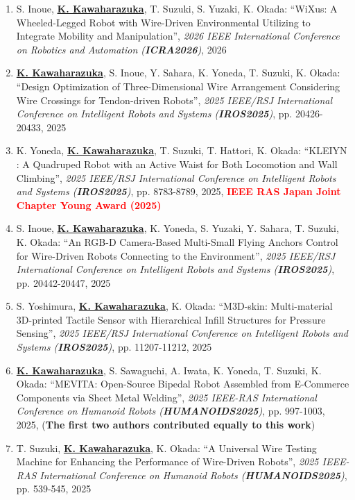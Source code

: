 \documentclass[letterpaper,11pt]{article}
\begin{document}
\begin{enumerate}
\item S. Inoue, \underline{\textbf{K. Kawaharazuka}}, T. Suzuki, S. Yuzaki, K. Okada: ``WiXus: A Wheeled-Legged Robot with Wire-Driven Environmental Utilizing to Integrate Mobility and Manipulation'', \textit{2026 IEEE International Conference on Robotics and Automation (\textit{\textbf{ICRA2026}})}, 2026
\item \underline{\textbf{K. Kawaharazuka}}, S. Inoue, Y. Sahara, K. Yoneda, T. Suzuki, K. Okada: ``Design Optimization of Three-Dimensional Wire Arrangement Considering Wire Crossings for Tendon-driven Robots'', \textit{2025 IEEE/RSJ International Conference on Intelligent Robots and Systems (\textit{\textbf{IROS2025}})}, pp. 20426-20433, 2025
\item K. Yoneda, \underline{\textbf{K. Kawaharazuka}}, T. Suzuki, T. Hattori, K. Okada: ``KLEIYN : A Quadruped Robot with an Active Waist for Both Locomotion and Wall Climbing'', \textit{2025 IEEE/RSJ International Conference on Intelligent Robots and Systems (\textit{\textbf{IROS2025}})}, pp. 8783-8789, 2025, \textbf{\textcolor{red}{IEEE RAS Japan Joint Chapter Young Award (2025)}}
\item S. Inoue, \underline{\textbf{K. Kawaharazuka}}, K. Yoneda, S. Yuzaki, Y. Sahara, T. Suzuki, K. Okada: ``An RGB-D Camera-Based Multi-Small Flying Anchors Control for Wire-Driven Robots Connecting to the Environment'', \textit{2025 IEEE/RSJ International Conference on Intelligent Robots and Systems (\textit{\textbf{IROS2025}})}, pp. 20442-20447, 2025
\item S. Yoshimura, \underline{\textbf{K. Kawaharazuka}}, K. Okada: ``M3D-skin: Multi-material 3D-printed Tactile Sensor with Hierarchical Infill Structures for Pressure Sensing'', \textit{2025 IEEE/RSJ International Conference on Intelligent Robots and Systems (\textit{\textbf{IROS2025}})}, pp. 11207-11212, 2025
\item \underline{\textbf{K. Kawaharazuka}}, S. Sawaguchi, A. Iwata, K. Yoneda, T. Suzuki, K. Okada: ``MEVITA: Open-Source Bipedal Robot Assembled from E-Commerce Components via Sheet Metal Welding'', \textit{2025 IEEE-RAS International Conference on Humanoid Robots (\textit{\textbf{HUMANOIDS2025}})}, pp. 997-1003, 2025, (\textbf{The first two authors contributed equally to this work})
\item T. Suzuki, \underline{\textbf{K. Kawaharazuka}}, K. Okada: ``A Universal Wire Testing Machine for Enhancing the Performance of Wire-Driven Robots'', \textit{2025 IEEE-RAS International Conference on Humanoid Robots (\textit{\textbf{HUMANOIDS2025}})}, pp. 539-545, 2025

\end{enumerate}
\end{document}
